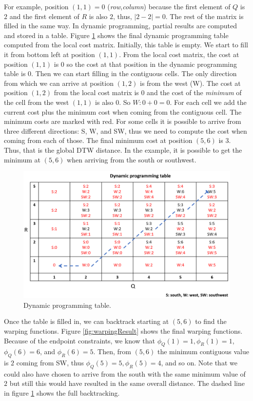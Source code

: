 \documentclass[
  11pt,
]{krantz}
\begin{document}
For example, position \((1,1)=0\) (\emph{row},\emph{column}) because the first element of \(Q\) is \(2\) and the first element of \(R\) is also \(2\), thus, \(|2-2|=0\). The rest of the matrix is filled in the same way. In dynamic programming, partial results are computed and stored in a table. Figure \ref{fig:dynamicTable} shows the final dynamic programming table computed from the local cost matrix. Initially, this table is empty. We start to fill it from bottom left at position \((1,1)\). From the local cost matrix, the cost at position \((1,1)\) is \(0\) so the cost at that position in the dynamic programming table is \(0\). Then we can start filling in the contiguous cells. The only direction from which we can arrive at position \((1,2)\) is from the west (W). The cost at position \((1,2)\) from the local cost matrix is \(0\) and the cost of the \emph{minimum} of the cell from the west \((1,1)\) is also \(0\). So \(W:0+0=0\). For each cell we add the current cost plus the minimum cost when coming from the contiguous cell. The minimum costs are marked with red. For some cells it is possible to arrive from three different directions: S, W, and SW, thus we need to compute the cost when coming from each of those. The final minimum cost at position \((5,6)\) is \(3\). Thus, that is the global DTW distance. In the example, it is possible to get the minimum at \((5,6)\) when arriving from the south or southwest.

\begin{figure}

{\centering \includegraphics[width=0.9\linewidth]{images/dynamicprogramming} 

}

\caption{Dynamic programming table.}\label{fig:dynamicTable}
\end{figure}

Once the table is filled in, we can backtrack starting at \((5,6)\) to find the warping functions. Figure \ref{fig:warpingResult} shows the final warping functions. Because of the endpoint constraints, we know that \(\phi_Q(1)=1, \phi_R(1)=1\), \(\phi_Q(6)=6\), and \(\phi_R(6)=5\). Then, from \((5,6)\) the minimum contiguous value is \(2\) coming from SW, thus \(\phi_Q(5)=5, \phi_R(5)=4\), and so on. Note that we could also have chosen to arrive from the south with the same minimum value of \(2\) but still this would have resulted in the same overall distance. The dashed line in figure \ref{fig:dynamicTable} shows the full backtracking.
\end{document}
